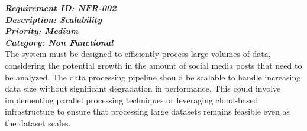 \noindent
\textbf{\emph{Requirement ID: NFR-002}} \\ 
\textbf{\emph{Description:  Scalability}} \\
\textbf{\emph{Priority: Medium}} \\
\textbf{\emph{Category: Non Functional}} \\
\noindent
The system must be designed to efficiently process large volumes of data, considering the potential growth in the amount of social media posts that need to be analyzed. The data processing pipeline should be scalable to handle increasing data size without significant degradation in performance. This could involve implementing parallel processing techniques or leveraging cloud-based infrastructure to ensure that processing large datasets remains feasible even as the dataset scales. 


